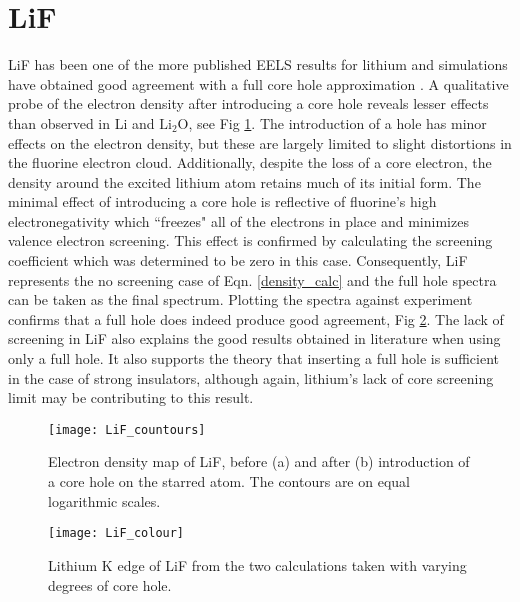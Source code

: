 \section{LiF}
LiF has been one of the more published EELS results for lithium and simulations have obtained good agreement with a full core hole approximation \cite{gao_theory_2008, mauchamp_ab_2006}.  A qualitative probe of the electron density after introducing a core hole reveals lesser effects than observed in Li and $ \mathrm{Li_2O} $, see Fig \ref{LiF_countours}.  The introduction of a hole has minor effects on the electron density, but these are largely limited to slight distortions in the fluorine electron cloud. Additionally, despite the loss of a core electron, the density around the excited lithium atom retains much of its initial form. The minimal effect of introducing a core hole is reflective of fluorine's high electronegativity which ``freezes" all of the electrons in place and minimizes valence electron screening.  This effect is confirmed by calculating the screening coefficient which was determined to be zero in this case. Consequently, LiF represents the no screening case of Eqn. \ref{density_calc} and the full hole spectra can be taken as the final spectrum.  Plotting the spectra against experiment confirms that a full hole does indeed produce good agreement, Fig \ref{LiF_spectra}.  The lack of screening in LiF also explains the good results obtained in literature when using only a full hole.  It also supports the theory that inserting a full hole is sufficient in the case of strong insulators, although again, lithium's lack of core screening limit may be contributing to this result.

\begin{figure}
	\centering
	\texttt{[image: LiF\_countours]}
	\caption{Electron density map of LiF, before (a) and after (b) introduction of a core hole on the starred atom.  The contours are on equal logarithmic scales.}
	\label{LiF_countours}
\end{figure}

\begin{figure}
	\centering
	\texttt{[image: LiF\_colour]}
	\caption{Lithium K edge of LiF from the two calculations taken with varying degrees of core hole. }
	\label{LiF_spectra}
\end{figure}



